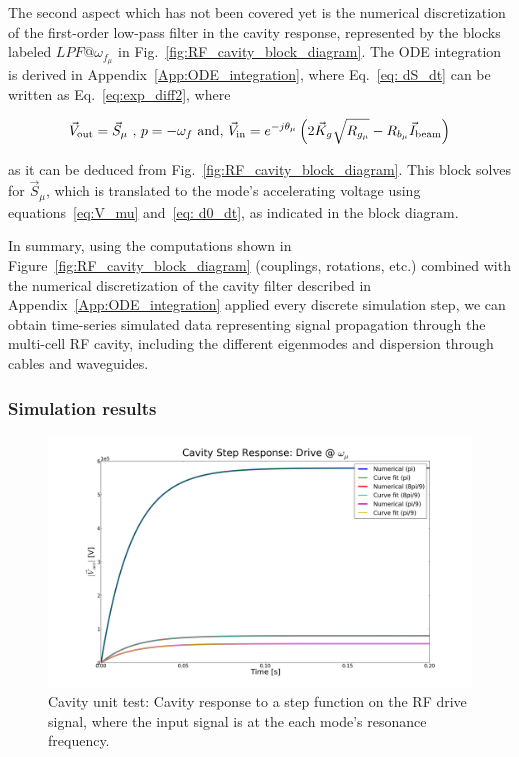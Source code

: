\documentclass[a4paper,12pt]{article}
\begin{document}
The second aspect which has not been covered yet is the numerical discretization of the first-order low-pass filter in the cavity response, represented by the blocks labeled $LPF@\omega_{f_{\mu}}$ in Fig.~\ref{fig:RF_cavity_block_diagram}. The ODE integration is derived in Appendix~\ref{App:ODE_integration}, where Eq.~\ref{eq: dS_dt} can be written as Eq.~\ref{eq:exp_diff2}, where

\begin{equation}
 \vec V_{\rm out} = \vec S_{\mu} \mbox{ , } p = -\omega_f \mbox{ and, } \vec V_{\rm in} = e^{-j\theta_{\mu}} \left(2\vec{K}_g\sqrt{R_{g_{\mu}}} - R_{b_{\mu}}\vec{I}_{\rm beam}\right)
\end{equation}

\noindent as it can be deduced from Fig.~\ref{fig:RF_cavity_block_diagram}. This block solves for $\vec S_{\mu}$, which is translated to the mode's accelerating voltage using equations~\ref{eq:V_mu} and~\ref{eq: d0_dt}, as indicated in the block diagram.

In summary, using the computations shown in Figure~\ref{fig:RF_cavity_block_diagram} (couplings, rotations, etc.) combined with the numerical discretization of the cavity filter described in Appendix~\ref{App:ODE_integration} applied every discrete simulation step, we can obtain time-series simulated data representing signal propagation through the multi-cell RF cavity, including the different eigenmodes and dispersion through cables and waveguides.

\subsubsection{Simulation results}
\label{sec:cav_sim_results}

\begin{figure}
\centering
\includegraphics[scale=0.26]{../figures/cavity_test_drive.png}
\caption{Cavity unit test: Cavity response to a step function on the RF drive signal, where the input signal is at the each mode's resonance frequency.}
\label{fig:cav_step1}
\end{figure}
\end{document}
